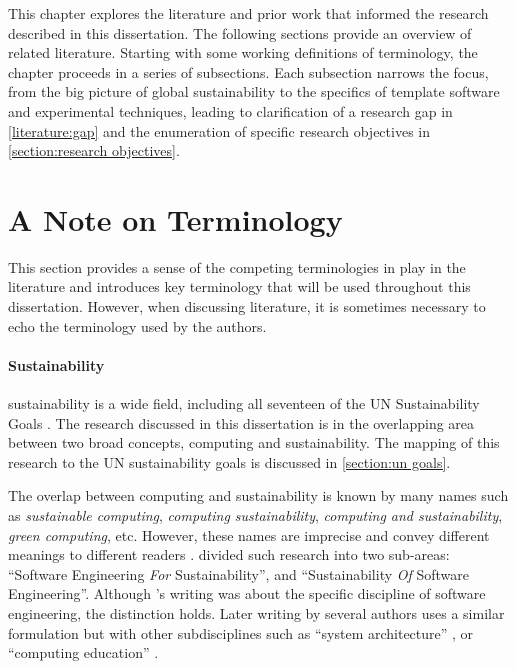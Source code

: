 This chapter explores the literature and prior work that informed the research described in this dissertation. The following sections provide an overview of related literature. Starting with some working definitions of terminology, the chapter proceeds in a series of subsections. Each subsection narrows the focus, from the big picture of global sustainability to the specifics of template software and experimental techniques, leading to clarification of a research gap in \autoref{literature:gap} and the enumeration of specific research objectives in \autoref{section:research objectives}.

\section{A Note on Terminology}
\label{section:terminology}

This section provides a sense of the competing terminologies in play in the literature and introduces key terminology that will be used throughout this dissertation. However, when discussing literature, it is sometimes necessary to echo the terminology used by the authors.

\paragraph{Sustainability}
\Gls{sustainability} is a wide field, including all seventeen of the UN Sustainability Goals \citep{UnitedNations2015}. The research discussed in this dissertation is in the overlapping area between two broad concepts, \gls{computing} and \gls{sustainability}. The mapping of this research to the UN sustainability goals is discussed in \autoref{section:un goals}.

The overlap between \gls{computing} and \gls{sustainability} is known by many names such as \emph{\gls{sustainable computing}}, \emph{\gls{computing sustainability}}, \emph{\gls{computing and sustainability}}, \emph{\gls{green computing}}, etc. However, these names are imprecise and convey different meanings to different readers \citep{Venters2014}. \textcite{Penzenstadler2013} divided such research into two sub-areas: \enquote{Software Engineering \emph{For} Sustainability}, and \enquote{Sustainability \emph{Of} Software Engineering}. Although \citeauthor{Penzenstadler2013}'s writing was about the specific discipline of software engineering, the distinction holds. Later writing by several authors uses a similar formulation but with other subdisciplines such as \enquote{system architecture} \citep{Dixit2024}, or \enquote{computing education} \citep{Mann2007}.

